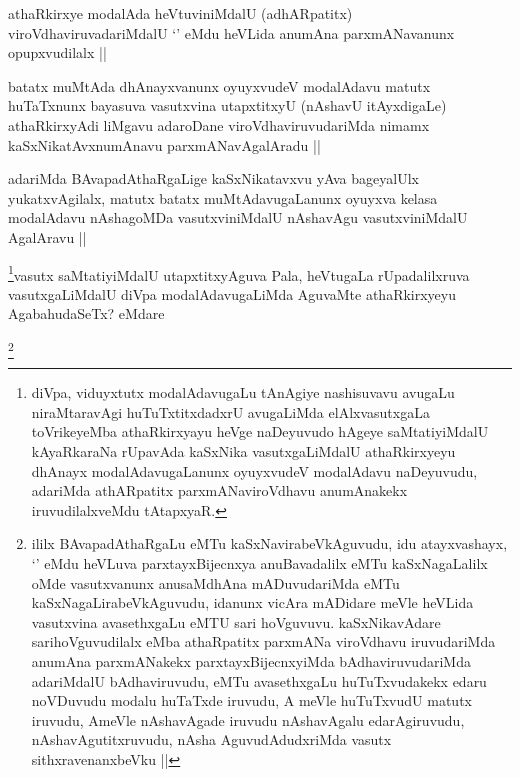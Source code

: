 \begin{artha}
athaRkirxye modalAda heVtuviniMdalU (adhARpatitx) viroVdhaviruvadariMdalU `\stext' eMdu heVLida anumAna parxmANavanunx opupxvudilalx ||
\end{artha}

\begin{artha}
batatx muMtAda dhAnayxvanunx oyuyxvudeV modalAdavu matutx huTaTxnunx bayasuva vasutxvina utapxtitxyU (nAshavU itAyxdigaLe) athaRkirxyAdi liMgavu adaroDane viroVdhaviruvudariMda nimamx kaSxNikatAvxnumAnavu parxmANavAgalAradu ||
\end{artha}

\begin{artha}
adariMda BAvapadAthaRgaLige kaSxNikatavxvu yAva bageyalUlx yukatxvAgilalx, matutx batatx muMtAdavugaLanunx oyuyxva kelasa modalAdavu nAshagoMDa vasutxviniMdalU nAshavAgu vasutxviniMdalU AgalAravu ||
\end{artha}

\begin{artha}
\footnote{diVpa, viduyxtutx modalAdavugaLu tAnAgiye nashisuvavu avugaLu niraMtaravAgi huTuTxtitxdadxrU avugaLiMda elAlxvasutxgaLa toVrikeyeMba athaRkirxyayu heVge naDeyuvudo hAgeye saMtatiyiMdalU kAyaRkaraNa rUpavAda kaSxNika vasutxgaLiMdalU athaRkirxyeyu dhAnayx modalAdavugaLanunx oyuyxvudeV modalAdavu naDeyuvudu, adariMda athARpatitx parxmANaviroVdhavu anumAnakekx iruvudilalxveMdu tAtapxyaR.}vasutx saMtatiyiMdalU utapxtitxyAguva Pala, heVtugaLa rUpadalilxruva vasutxgaLiMdalU diVpa modalAdavugaLiMda AguvaMte athaRkirxyeyu AgabahudaSeTx? eMdare
\end{artha}

\begin{artha}
\footnote{ililx BAvapadAthaRgaLu eMTu kaSxNavirabeVkAguvudu, idu atayxvashayx, `\stext' eMdu heVLuva parxtayxBijecnxya anuBavadalilx eMTu kaSxNagaLalilx oMde vasutxvanunx anusaMdhAna mADuvudariMda eMTu kaSxNagaLirabeVkAguvudu, idanunx vicAra mADidare meVle heVLida vasutxvina avasethxgaLu eMTU sari hoVguvuvu. kaSxNikavAdare sarihoVguvudilalx eMba athaRpatitx parxmANa viroVdhavu iruvudariMda anumAna parxmANakekx parxtayxBijecnxyiMda bAdhaviruvudariMda adariMdalU bAdhaviruvudu, eMTu avasethxgaLu huTuTxvudakekx edaru noVDuvudu modalu huTaTxde iruvudu, A meVle huTuTxvudU matutx iruvudu, AmeVle nAshavAgade iruvudu nAshavAgalu edarAgiruvudu, nAshavAgutitxruvudu, nAsha AguvudAdudxriMda vasutx sithxravenanxbeVku ||}
\end{artha}

